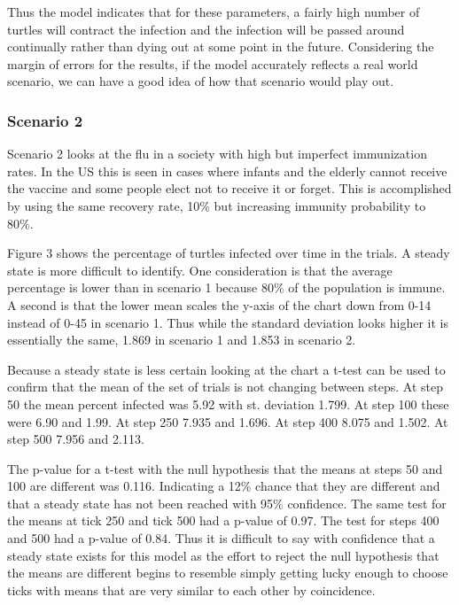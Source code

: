 \documentclass[11pt]{article} %
\begin{document}

Thus the model indicates that for these parameters, a fairly high number of turtles will contract the infection and the infection will be passed around continually rather than dying out at some point in the future. Considering the margin of errors for the results, if the model accurately reflects a real world scenario, we can have a good idea of how that scenario would play out. 

\subsubsection{Scenario 2}

Scenario 2 looks at the flu in a society with high but imperfect immunization rates. In the US this is seen in cases where infants and the elderly cannot receive the vaccine and some people elect not to receive it or forget. This is accomplished by using the same recovery rate, 10\% but increasing immunity probability to 80\%. 



 Figure 3 shows the percentage of turtles infected over time in the trials. A steady state is more difficult to identify. One consideration is that the average percentage is lower than in scenario 1 because 80\% of the population is immune. A second is that the lower mean scales the y-axis of the chart down from 0-14 instead of 0-45 in scenario 1. Thus while the standard deviation looks higher it is essentially the same, 1.869 in scenario 1 and 1.853 in scenario 2. 

Because a steady state is less certain looking at the chart a t-test can be used to confirm that the mean of the set of trials is not changing between steps. At step 50 the mean percent infected was 5.92 with st. deviation 1.799. At step 100 these were 6.90 and 1.99. At step 250 7.935 and 1.696. At step 400 8.075 and 1.502. At step 500 7.956 and 2.113. 

The p-value for a t-test with the null hypothesis that the means at steps 50 and 100 are different was 0.116. Indicating a 12\% chance that they are different and that a steady state has not been reached with 95\% confidence. The same test for the means at tick 250 and tick 500 had a p-value of 0.97. The test for steps 400 and 500 had a p-value of 0.84. Thus it is difficult to say with confidence that a steady state exists for this model as the effort to reject the null hypothesis that the means are different begins to resemble simply getting lucky enough to choose ticks with means that are very similar to each other by coincidence. 
\end{document}
